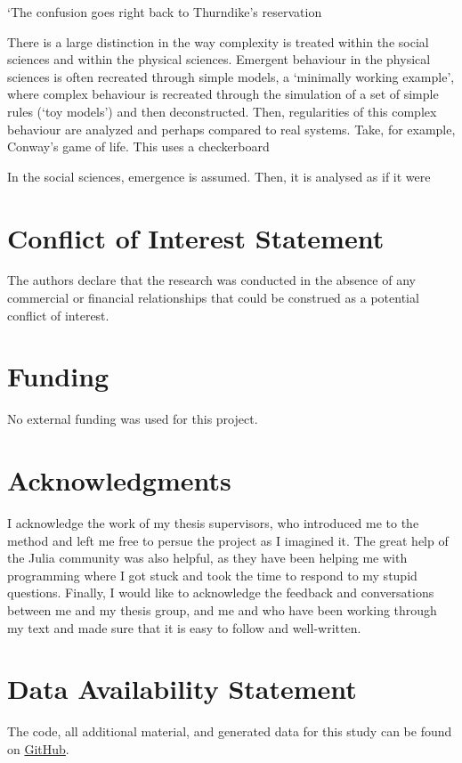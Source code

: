 \documentclass[utf8]{FrontiersinVancouver}
\begin{document}
    `The confusion goes right back to Thurndike's reservation 





There is a large distinction in the way complexity is treated within the social sciences and within the physical sciences. Emergent behaviour in the physical sciences is often recreated through simple models, a `minimally working example', where complex behaviour is recreated through the simulation of a set of simple rules (`toy models') and then deconstructed. Then, regularities of this complex behaviour are analyzed and perhaps compared to real systems. Take, for example, Conway's game of life. This uses a checkerboard 

In the social sciences, emergence is assumed. Then, it is analysed as if it were 


\section*{Conflict of Interest Statement}
The authors declare that the research was conducted in the absence of any commercial or financial relationships that could be construed as a potential conflict of interest.

\section*{Funding}
No external funding was used for this project.

\section*{Acknowledgments}
I acknowledge the work of my thesis supervisors, who introduced me to the method and left me free to persue the project as I imagined it. The great help of the Julia community was also helpful, as they have been helping me with programming where I got stuck and took the time to respond to my stupid questions. Finally, I would like to acknowledge the feedback and conversations between me and my thesis group, and me and  who have been working through my text and made sure that it is easy to follow and well-written.

\section*{Data Availability Statement}
The code, all additional material, and generated data for this study can be found on \href{https://github.com/MvanSteenbergen/MasterThesisRQA}{GitHub}.
\end{document}
